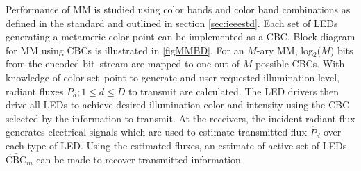
Performance of MM is studied using color bands and color band combinations as defined in the standard and outlined in section \ref{sec:ieeestd}. Each set of LEDs generating a metameric color point can be implemented as a CBC. Block diagram for MM using CBCs is illustrated in \figurename{ \ref{figMMBD}}. For an $M$-ary MM, log$^{ }_{2}$($M$) bits from the encoded bit--stream are mapped to one out of $M$ possible CBCs. With knowledge of color set--point to generate and user requested illumination level, radiant fluxes $P_{d}; 1\leq d\leq D$ to transmit are calculated. The LED drivers then drive all LEDs to achieve desired illumination color and intensity using the CBC selected by the information to transmit. At the receivers, the incident radiant flux generates electrical signals which are used to estimate transmitted flux $\hat{P}_{d}$ over each type of LED. Using the estimated fluxes, an estimate of active set of LEDs $\hat{\text{CBC}}_{m}$ can be made to recover transmitted information.

